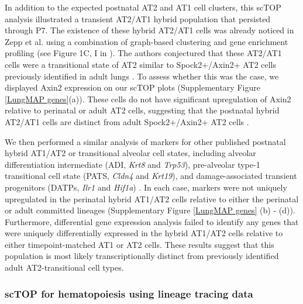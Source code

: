 \documentclass[vruler,JEB]{COB}%
\begin{document}
In addition to the expected postnatal AT2 and AT1 cell clusters, this scTOP analysis illustrated a transient AT2/AT1 hybrid population that persisted through P7. The existence of these hybrid AT2/AT1 cells was already noticed in Zepp et al. using a combination of graph-based clustering and gene enrichment profiling (see Figure 1C, I in \cite{zepp2021genomic}). The authors conjectured that these AT2/AT1 cells were a transitional state of AT2 similar to Spock2+/Axin2+ AT2 cells previously identified in adult lungs \citep{frank2016emergence}. To assess whether this was the case, we displayed Axin2 expression on our scTOP plots (Supplementary Figure \ref{LungMAP genes}(a)). These cells do not have significant upregulation of Axin2 relative to perinatal or adult AT2 cells, suggesting that the postnatal hybrid AT2/AT1 cells are distinct from adult Spock2+/Axin2+ AT2 cells \citep{frank2016emergence}.

We then performed a similar analysis of markers for other published postnatal hybrid AT1/AT2 or transitional alveolar cell states, including alveolar differentiation intermediate (ADI, {\it Krt8} and {\it Trp53}), pre-alveolar type-1 transitional cell state (PATS, {\it Cldn4} and {\it Krt19}), and damage-associated transient progenitors (DATPs, {\it Ilr1} and {\it Hif1a}) \citep{verheyden2020transitional, strunz2020alveolar, kobayashi2020persistence, choi2020inflammatory}. In each case, markers were not uniquely upregulated in the perinatal hybrid AT1/AT2 cells relative to either the perinatal or adult committed lineages (Supplementary Figure \ref{LungMAP genes} (b) - (d)). Furthermore, differential gene expression analysis failed to identify any genes that were uniquely differentially expressed in the hybrid AT1/AT2 cells relative to either timepoint-matched AT1 or AT2 cells. These results suggest that this population is most likely transcriptionally distinct from previously identified adult AT2-transitional cell types. 

\subsubsection{scTOP for hematopoiesis using lineage tracing data}
\end{document}
